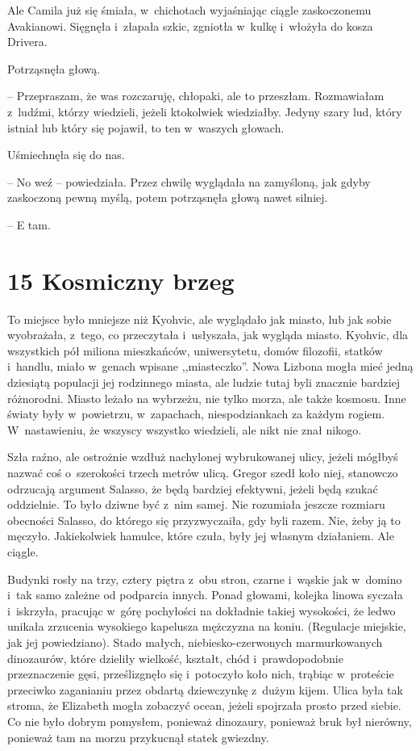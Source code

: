 \documentclass[oneside,polish,12pt,sfheadings]{mwbk}
\begin{document}
Ale Camila już się śmiała, w~chichotach wyjaśniając ciągle zaskoczonemu
Avakianowi. Sięgnęła i~złapała szkic, zgniotła w~kulkę i~włożyła do
kosza Drivera.

Potrząsnęła głową. 

-- Przepraszam, że was rozczaruję, chłopaki, ale to
przeszłam. Rozmawiałam z~ludźmi, którzy wiedzieli, jeżeli ktokolwiek
wiedziałby. Jedyny szary lud, który istniał lub który się pojawił, to
ten w~waszych głowach.

Uśmiechnęła się do nas. 

-- No weź -- powiedziała. Przez chwilę wyglądała
na zamyśloną, jak gdyby zaskoczoną pewną myślą, potem potrząsnęła głową
nawet silniej.

-- E tam.



\chapter[Kosmiczny brzeg]{15 Kosmiczny brzeg}


To miejsce było mniejsze niż Kyohvic, ale wyglądało jak miasto, lub jak
sobie wyobrażała, z~tego, co przeczytała i~usłyszała, jak wygląda
miasto. Kyohvic, dla wszystkich pół miliona mieszkańców, uniwersytetu,
domów filozofii, statków i~handlu, miało w~genach wpisane ,,miasteczko''.
Nowa Lizbona mogła mieć jedną dziesiątą populacji jej rodzinnego miasta,
ale ludzie tutaj byli znacznie bardziej różnorodni. Miasto leżało na
wybrzeżu, nie tylko morza, ale także kosmosu. Inne światy były w~powietrzu, w~zapachach, niespodziankach za każdym rogiem. W~nastawieniu,
że wszyscy wszystko wiedzieli, ale nikt nie znał nikogo.

Szła raźno, ale ostrożnie wzdłuż nachylonej wybrukowanej ulicy, jeżeli
mógłbyś nazwać coś o~szerokości trzech metrów ulicą. Gregor szedł koło
niej, stanowczo odrzucają argument Salasso, że będą bardziej efektywni,
jeżeli będą szukać oddzielnie. To było dziwne być z~nim samej. Nie
rozumiała jeszcze rozmiaru obecności Salasso, do którego się
przyzwyczaiła, gdy byli razem. Nie, żeby ją to męczyło. Jakiekolwiek
hamulce, które czuła, były jej własnym działaniem. Ale ciągle.

Budynki rosły na trzy, cztery piętra z~obu stron, czarne i~wąskie jak w~domino i~tak samo zależne od podparcia innych. Ponad głowami, kolejka
linowa syczała i~iskrzyła, pracując w~górę pochyłości na dokładnie
takiej wysokości, że ledwo unikała zrzucenia wysokiego kapelusza
mężczyzna na koniu. (Regulacje miejskie, jak jej powiedziano). Stado
małych, niebiesko-czerwonych marmurkowanych dinozaurów, które dzieliły
wielkość, kształt, chód i~prawdopodobnie przeznaczenie gęsi,
prześlizgnęło się i~potoczyło koło nich, trąbiąc w~proteście przeciwko
zaganianiu przez obdartą dziewczynkę z~dużym kijem. Ulica była tak
stroma, że Elizabeth mogła zobaczyć ocean, jeżeli spojrzała prosto przed
siebie. Co nie było dobrym pomysłem, ponieważ dinozaury, ponieważ bruk
był nierówny, ponieważ tam na morzu przykucnął statek gwiezdny.
\end{document}
